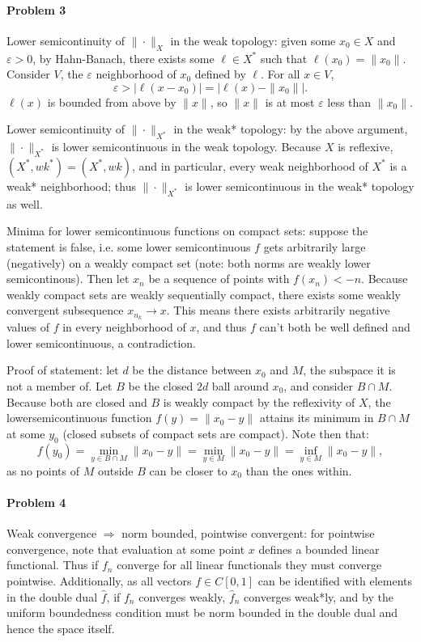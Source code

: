 \documentclass[12pt]{article}
\begin{document}
\paragraph{Problem 3}

Lower semicontinuity of $\|\cdot\|_X$ in the weak topology: given some $x_0\in X$
and $\varepsilon >0$, by Hahn-Banach, there exists some $\ell\in X^*$ such that
$\ell(x_0) = \|x_0\|$. Consider $V$, the $\varepsilon$ neighborhood of $x_0$
defined by $\ell$. For all $x\in V$,
\begin{displaymath}
  \varepsilon >|\ell(x-x_0)| = |\ell(x)-\|x_0\||.
\end{displaymath}
$\ell(x)$ is bounded from above by $\|x\|$, so $\|x\|$ is at most $\varepsilon$
less than $\|x_0\|$.

Lower semicontinuity of $\|\cdot\|_{X^*}$ in the weak* topology: by the above
argument, $\|\cdot\|_{X^*}$ is lower semicontinuous in the weak topology. Because
$X$ is reflexive, $(X^*,wk^*) = (X^*,wk)$, and in particular, every weak
neighborhood of $X^*$ is a weak* neighborhood; thus $\|\cdot\|_{X^*}$ is lower
semicontinuous in the weak* topology as well.

Minima for lower semicontinuous functions on compact sets: suppose the statement
is false, i.e. some lower semicontinuous $f$ gets arbitrarily large (negatively)
on a weakly compact set (note: both norms are weakly lower semicontinous). Then
let $x_n$ be a sequence of points with $f(x_n) < -n$. Because weakly compact
sets are weakly sequentially compact, there exists some weakly convergent
subsequence $x_{n_k}\to x$. This means there exists arbitrarily negative values of
$f$ in every neighborhood of $x$, and thus $f$ can't both be well defined and
lower semicontinuous, a contradiction.

Proof of statement: let $d$ be the distance between $x_0$ and $M$, the subspace
it is not a member of. Let $B$ be the closed $2d$ ball around $x_0$, and consider
$B\cap M$. Because both are closed and $B$ is weakly compact by the reflexivity
of $X$, the lowersemicontinuous function $f(y) = \|x_0-y\|$ attains its minimum
in $B\cap M$ at some $y_0$ (closed subsets of compact sets are compact).
Note then that:
\begin{displaymath}
  f(y_0) = \min_{y\in B\cap M}\|x_0-y\| = \min_{y\in M}\|x_0-y\| = \inf_{y\in M}
  \|x_0-y\|,
\end{displaymath}
as no points of $M$ outside $B$ can be closer to $x_0$ than the ones within.

\paragraph{Problem 4}
Weak convergence $\Rightarrow$ norm bounded, pointwise convergent: for pointwise
convergence, note that evaluation at some point $x$ defines a bounded linear
functional. Thus if $f_n$ converge for all linear functionals they must converge
pointwise. Additionally, as all vectors $f \in C[0,1]$ can be identified with
elements in the double dual $\hat{f}$, if $f_n$ converges weakly, $\hat{f}_n$
converges weak*ly, and by the uniform boundedness condition must be norm bounded
in the double dual and hence the space itself.
\end{document}
